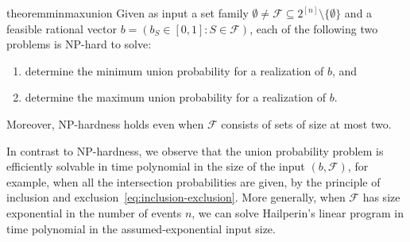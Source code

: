 \documentclass[11pt]{article}
\begin{document}
\begin{restatable}{theorem}{minmaxunion}
\label{thm:minmax}
Given as input a set family
$\emptyset\neq\mathcal{F}\subseteq 2^{[n]}\setminus\{\emptyset\}$ 
and a feasible
rational vector $b=(b_S\in[0,1]:S\in\mathcal{F})$, 
each of the following two problems is NP-hard to solve:
\begin{enumerate}
\item
determine the minimum union probability for a realization of $b$, and
\item
determine the maximum union probability for a realization of $b$.
\end{enumerate}
Moreover, NP-hardness holds even when $\mathcal{F}$ consists of sets of size 
at most two.
\end{restatable}


\begin{remark}
In contrast to NP-hardness, we observe that the union probability problem 
is efficiently solvable in time polynomial in the size of the input 
$(b,\mathcal{F})$, for example, when all the intersection 
probabilities are given, by the principle of inclusion and 
exclusion~\eqref{eq:inclusion-exclusion}. More generally, 
when $\mathcal{F}$ has size exponential in the number of events $n$, 
we can solve Hailperin's linear program in time polynomial in 
the assumed-exponential input size.
\end{remark}
\end{document}

